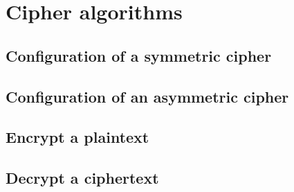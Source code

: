 \chapter{Cipher algorithms}
\label{cipher}

\section{Configuration of a symmetric cipher}

\section{Configuration of an asymmetric cipher}

\section{Encrypt a plaintext}

\section{Decrypt a ciphertext}